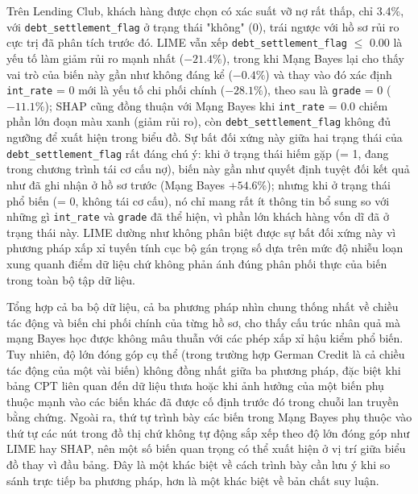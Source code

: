 Trên Lending Club, khách hàng được chọn có xác suất vỡ nợ rất thấp, chỉ 3.4\%, với \texttt{debt\_settlement\_flag} ở trạng thái "không" (0), trái ngược với hồ sơ rủi ro cực trị đã phân tích trước đó. LIME vẫn xếp \texttt{debt\_settlement\_flag} $\leq$ 0.00 là yếu tố làm giảm rủi ro mạnh nhất ($-21.4\%$), trong khi Mạng Bayes lại cho thấy vai trò của biến này gần như không đáng kể ($-0.4\%$) và thay vào đó xác định \texttt{int\_rate} = 0 mới là yếu tố chi phối chính ($-28.1\%$), theo sau là \texttt{grade} = 0 ($-11.1\%$); SHAP cũng đồng thuận với Mạng Bayes khi \texttt{int\_rate} = 0.0 chiếm phần lớn đoạn màu xanh (giảm rủi ro), còn \texttt{debt\_settlement\_flag} không đủ ngưỡng để xuất hiện trong biểu đồ. Sự bất đối xứng này giữa hai trạng thái của \texttt{debt\_settlement\_flag} rất đáng chú ý: khi ở trạng thái hiếm gặp (= 1, đang trong chương trình tái cơ cấu nợ), biến này gần như quyết định tuyệt đối kết quả như đã ghi nhận ở hồ sơ trước (Mạng Bayes $+54.6\%$); nhưng khi ở trạng thái phổ biến (= 0, không tái cơ cấu), nó chỉ mang rất ít thông tin bổ sung so với những gì \texttt{int\_rate} và \texttt{grade} đã thể hiện, vì phần lớn khách hàng vốn dĩ đã ở trạng thái này. LIME dường như không phân biệt được sự bất đối xứng này vì phương pháp xấp xỉ tuyến tính cục bộ gán trọng số dựa trên mức độ nhiễu loạn xung quanh điểm dữ liệu chứ không phản ánh đúng phân phối thực của biến trong toàn bộ tập dữ liệu.

Tổng hợp cả ba bộ dữ liệu, cả ba phương pháp nhìn chung thống nhất về chiều tác động và biến chi phối chính của từng hồ sơ, cho thấy cấu trúc nhân quả mà mạng Bayes học được không mâu thuẫn với các phép xấp xỉ hậu kiểm phổ biến. Tuy nhiên, độ lớn đóng góp cụ thể (trong trường hợp German Credit là cả chiều tác động của một vài biến) không đồng nhất giữa ba phương pháp, đặc biệt khi bảng CPT liên quan đến dữ liệu thưa hoặc khi ảnh hưởng của một biến phụ thuộc mạnh vào các biến khác đã được cố định trước đó trong chuỗi lan truyền bằng chứng. Ngoài ra, thứ tự trình bày các biến trong Mạng Bayes phụ thuộc vào thứ tự các nút trong đồ thị chứ không tự động sắp xếp theo độ lớn đóng góp như LIME hay SHAP, nên một số biến quan trọng có thể xuất hiện ở vị trí giữa biểu đồ thay vì đầu bảng. Đây là một khác biệt về cách trình bày cần lưu ý khi so sánh trực tiếp ba phương pháp, hơn là một khác biệt về bản chất suy luận.

